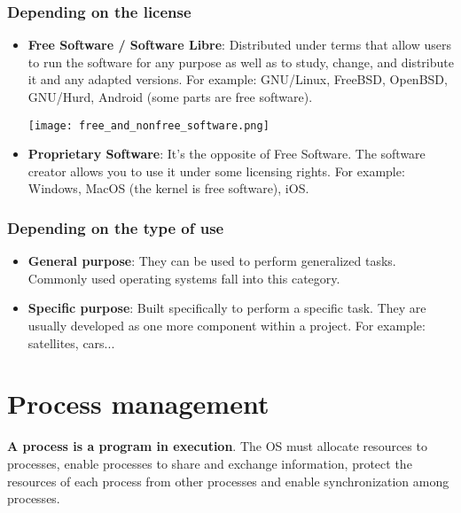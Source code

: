 \subsection{Depending on the license}
\begin{itemize}
    \item \textbf{Free Software / Software Libre}: Distributed under terms that allow users to run the software for any purpose as well as to study, change, and distribute it and any adapted versions. For example: GNU/Linux, FreeBSD, OpenBSD, GNU/Hurd, Android (some parts are free software).

    \begin{center}
        \texttt{[image: free\_and\_nonfree\_software.png]}\vspace{-10pt}
    \end{center}

    \item \textbf{Proprietary Software}: It's the opposite of Free Software. The software creator allows you to use it under some licensing rights. For example: Windows, MacOS (the kernel is free software), iOS.
\end{itemize}



\subsection{Depending on the type of use}
\begin{itemize}
    \item \textbf{General purpose}: They can be used to perform generalized tasks. Commonly used operating systems fall into this category.

    \item \textbf{Specific purpose}: Built specifically to perform a specific task. They are usually developed as one more component within a project. For example: satellites, cars...
\end{itemize}


\hypertarget{process_management}{}
\chapter{Process management}
\textbf{A process is a program in execution}. The OS must allocate resources to processes, enable processes to share and exchange information, protect the resources of each process from other processes and enable synchronization among processes.

